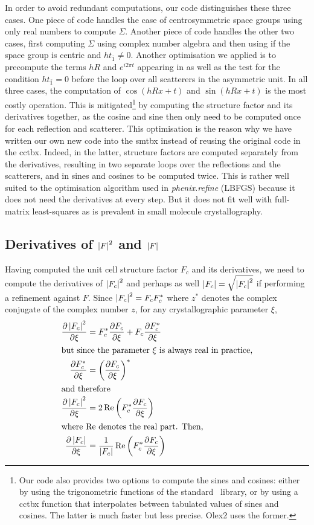 \documentclass[pdf]{iucr}
\begin{document}
In order to avoid redundant computations, our code distinguishes these three cases. One piece of code handles the case of centrosymmetric space groups using only real numbers to compute $\Sigma$. Another piece of code handles the other two cases, first computing $\Sigma$ using complex number algebra and then using  if the space group is centric and $h t_{\bar{1}} \neq 0$. Another optimisation we applied is to precompute the terms $hR$ and $e^{i2\pi t}$ appearing in  as well as the test for the condition $h t_{\bar{1}}=0$ before the loop over all scatterers in the asymmetric unit. In all three cases, the computation of $\cos(hRx + t)$ and $\sin(hRx + t)$ is the most costly operation. This is mitigated\footnote{Our code also provides two options to compute the sines and cosines: either by using the trigonometric functions of the standard \cpp\ library, or by using a cctbx function that interpolates between tabulated values of sines and cosines. The latter is much faster but less precise. Olex2 uses the former.} by computing the structure factor and its derivatives together, as the cosine and sine then only need to be computed once for each reflection and scatterer.
This optimisation is the reason why we have written our own new code into the smtbx instead of reusing the original code in the cctbx. Indeed, in the latter, structure factors are computed separately from the derivatives, resulting in two separate loops over the reflections and the scatterers, and in sines and cosines to be computed twice. This is rather well suited to the optimisation algorithm used in \emph{phenix.refine} (LBFGS) because it does not need the derivatives at every step. But it does not fit well with full-matrix least-squares as is prevalent in small molecule crystallography.  

\subsection{Derivatives of $\left| F \right|^2$ and $\left| F \right|$}

Having computed the unit cell structure factor $F_c$ and its derivatives, we need to compute the derivatives of $\left| F_c \right|^2$ and perhaps as well $\left| F_c \right| = \sqrt{\left| F_c \right|^2}$ if performing a refinement against $F$. Since $\left| F_c \right|^2 = F_c F_c^*$ where $z^*$ denotes the complex conjugate of the complex number $z$, for any crystallographic parameter $\xi$,
\begin{align}
\frac{\partial \left| F_c \right|^2}{\partial \xi} &= F_c^* \frac{\partial F_c}{\partial \xi} + F_c \frac{\partial F_c^*}{\partial \xi} \nonumber \\
\shortintertext{but since the parameter $\xi$ is always real in practice,}
\frac{\partial F_c^*}{\partial \xi} &= \left( \frac{\partial F_c}{\partial \xi} \right)^* \\
\shortintertext{and therefore}
\frac{\partial \left| F_c \right|^2}{\partial \xi} &= 2\operatorname{Re}\left( F_c^* \frac{\partial F_c}{\partial \xi}\right) \\
\shortintertext{where $\operatorname{Re}$ denotes the real part. Then,}
\frac{\partial \left| F_c \right|}{\partial \xi} &= \frac{1}{\left| F_c \right|} \operatorname{Re}\left( F_c^* \frac{\partial F_c}{\partial \xi}\right)
\end{align}
\end{document}
